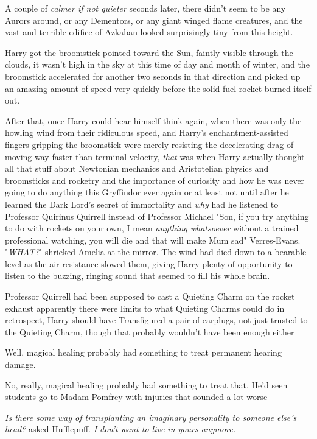 A couple of \emph{calmer if not quieter} seconds later, there didn't seem to be
any Aurors around, or any Dementors, or any giant winged flame creatures, and
the vast and terrible edifice of Azkaban looked surprisingly tiny from this
height.

Harry got the broomstick pointed toward the Sun, faintly visible through the
clouds, it wasn't high in the sky at this time of day and month of winter, and
the broomstick accelerated for another two seconds in that direction and picked
up an amazing amount of speed very quickly before the solid-fuel rocket burned
itself out.

After that, once Harry could hear himself think again, when there was only the
howling wind from their ridiculous speed, and Harry's enchantment-assisted
fingers gripping the broomstick were merely resisting the decelerating drag of
moving way faster than terminal velocity, \emph{that} was when Harry actually
thought all that stuff about Newtonian mechanics and Aristotelian physics and
broomsticks and rocketry and the importance of curiosity and how he was never
going to do anything this Gryffindor ever again or at least not until after he
learned the Dark Lord's secret of immortality and \emph{why} had he listened to
Professor Quirinus  Quirrell instead of Professor Michael
"Son, if you try anything to do with rockets on your own, I mean \emph{anything
whatsoever} without a trained professional watching, you will die and that will
make Mum sad" Verres-Evans.
\sbreak
"\emph{WHAT?}" shrieked Amelia at the mirror.
\sbreak
The wind had died down to a bearable level as the air resistance slowed them,
giving Harry plenty of opportunity to listen to the buzzing, ringing sound that
seemed to fill his whole brain.

Professor Quirrell had been supposed to cast a Quieting Charm on the rocket
exhaust{\el} apparently there were limits to what Quieting Charms could
do{\el} in retrospect, Harry should have Transfigured a pair of earplugs,
not just trusted to the Quieting Charm, though that probably wouldn't have been
enough either{\el}

Well, magical healing probably had something to treat permanent hearing damage.

No, really, magical healing probably had something to treat that. He'd seen
students go to Madam Pomfrey with injuries that sounded a lot worse{\el}

\emph{Is there some way of transplanting an imaginary personality to someone
else's head?} asked Hufflepuff. \emph{I don't want to live in yours anymore.}

